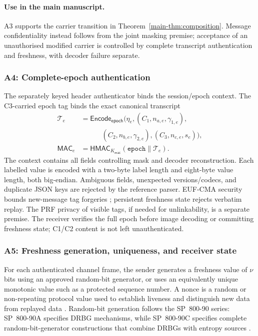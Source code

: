 \documentclass[journal]{IEEEtran}
\theoremstyle{definition}
\theoremstyle{game}
\begin{document}
\paragraph{Use in the main manuscript.}
A3 supports the carrier transition in Theorem~\ref{main-thm:composition}.
Message confidentiality instead follows from the joint masking premise;
acceptance of an unauthorised modified carrier is controlled by complete
transcript authentication and freshness, with decoder failure separate.

\subsubsection{A4: Complete-epoch authentication}\label{supp-assump:a4}
The separately keyed header authenticator binds the session/epoch context.
The C3-carried epoch tag binds the exact canonical transcript
\begin{align}\label{supp-eq:canonical-hmac}
\mathcal T_e&=\mathsf{Encode}_{\mathsf{epoch}}
(\eta_e,(C_1,n_{a,e},\gamma_{1,e}),\nonumber\\
&\hspace{3em}(C_2,n_{b,e},\gamma_{2,e}),(C_3,n_{c,e},s_e)),\nonumber\\
\mathsf{MAC}_e&=\mathsf{HMAC}_{K_{\mathsf{mac}}}(\texttt{epoch}\parallel\mathcal T_e).
\end{align}
The context contains all fields controlling mask and decoder reconstruction.
Each labelled value is encoded with a two-byte label length and eight-byte
value length, both big-endian. Ambiguous fields, unexpected versions/codecs,
and duplicate JSON keys are rejected by the reference parser.
EUF-CMA security bounds new-message tag forgeries
\cite{bellare1996keying,rfc2104}; persistent freshness state rejects verbatim
replay. The PRF privacy of visible tags, if needed for unlinkability, is a
separate premise. The receiver verifies the full epoch before image decoding
or committing freshness state; C1/C2 content is not left unauthenticated.

\subsubsection{A5: Freshness generation, uniqueness, and receiver state}
\label{supp-assump:a5}

For each authenticated channel frame, the sender generates a
freshness value of $\nu$ bits using an approved random-bit
generator, or uses an equivalently unique monotonic value such as
a protected sequence number. A nonce is a random or non-repeating
protocol value used to establish liveness and distinguish new data
from replayed data \cite{rfc4949}. Random-bit generation follows
the SP~800-90 series: SP~800-90A specifies DRBG mechanisms, while
SP~800-90C specifies complete random-bit-generator constructions
that combine DRBGs with entropy sources
\cite{nist80090ar1,nist80090c}.
\end{document}
